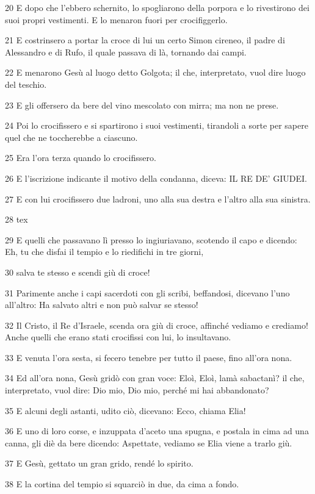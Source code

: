 \par 20 E dopo che l'ebbero schernito, lo spogliarono della porpora e lo rivestirono dei suoi propri vestimenti. E lo menaron fuori per crocifiggerlo.
\par 21 E costrinsero a portar la croce di lui un certo Simon cireneo, il padre di Alessandro e di Rufo, il quale passava di là, tornando dai campi.
\par 22 E menarono Gesù al luogo detto Golgota; il che, interpretato, vuol dire luogo del teschio.
\par 23 E gli offersero da bere del vino mescolato con mirra; ma non ne prese.
\par 24 Poi lo crocifissero e si spartirono i suoi vestimenti, tirandoli a sorte per sapere quel che ne toccherebbe a ciascuno.
\par 25 Era l'ora terza quando lo crocifissero.
\par 26 E l'iscrizione indicante il motivo della condanna, diceva: IL RE DE' GIUDEI.
\par 27 E con lui crocifissero due ladroni, uno alla sua destra e l'altro alla sua sinistra.
\par 28 tex
\par 29 E quelli che passavano lì presso lo ingiuriavano, scotendo il capo e dicendo: Eh, tu che disfai il tempio e lo riedifichi in tre giorni,
\par 30 salva te stesso e scendi giù di croce!
\par 31 Parimente anche i capi sacerdoti con gli scribi, beffandosi, dicevano l'uno all'altro: Ha salvato altri e non può salvar se stesso!
\par 32 Il Cristo, il Re d'Israele, scenda ora giù di croce, affinché vediamo e crediamo! Anche quelli che erano stati crocifissi con lui, lo insultavano.
\par 33 E venuta l'ora sesta, si fecero tenebre per tutto il paese, fino all'ora nona.
\par 34 Ed all'ora nona, Gesù gridò con gran voce: Eloì, Eloì, lamà sabactanì? il che, interpretato, vuol dire: Dio mio, Dio mio, perché mi hai abbandonato?
\par 35 E alcuni degli astanti, udito ciò, dicevano: Ecco, chiama Elia!
\par 36 E uno di loro corse, e inzuppata d'aceto una spugna, e postala in cima ad una canna, gli diè da bere dicendo: Aspettate, vediamo se Elia viene a trarlo giù.
\par 37 E Gesù, gettato un gran grido, rendé lo spirito.
\par 38 E la cortina del tempio si squarciò in due, da cima a fondo.
